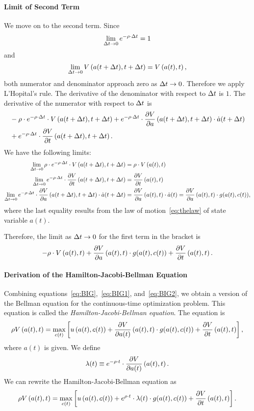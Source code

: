 \documentclass[letterpaper,12pt,leqno]{article}
\begin{document}
\paragraph{Limit of Second Term}  We move on to the second term. Since 
\[\lim_{\Delta t\to 0} e^{-\rho \cdot \Delta t}=1\]
and 
\[\lim_{\Delta t\to 0} V\left(  a(t+\Delta t),t+\Delta t \right) =V\left( a(t),t \right), \]
both numerator and denominator approach zero as $\Delta t\to 0$. Therefore we apply L'Hopital's rule. The derivative of the denominator with respect to $\Delta t$ is $1$. The derivative of the numerator with respect to $\Delta t$ is
\begin{align*}
&-\rho \cdot e^{-\rho\cdot \Delta t}\cdot V\left(  a(t+\Delta t),t+\Delta t \right)+e^{-\rho\cdot \Delta t}\cdot \frac{\partial V}{\partial a}\left(  a(t+\Delta t),t+\Delta t \right) \cdot \dot{a}(t+\Delta t)\\
&+e^{-\rho\cdot \Delta t}\cdot  \frac{\partial V}{\partial t}\left( a(t+\Delta t),t+\Delta t \right). 
\end{align*}
We have the following limits:
\begin{align*}
\lim_{\Delta t\to 0} \rho \cdot e^{-\rho\cdot \Delta t}\cdot V\left(  a(t+\Delta t),t+\Delta t \right)&=\rho \cdot V\left(  a(t),t \right)\\
\lim_{\Delta t\to 0} e^{-\rho\cdot \Delta t}\cdot  \frac{\partial V}{\partial t}\left( a(t+\Delta t),t+\Delta t \right) &= \frac{\partial V}{\partial t}\left( a(t),t \right)\\
\lim_{\Delta t\to 0} e^{-\rho\cdot \Delta t}\cdot \frac{\partial V}{\partial a}\left(  a(t+\Delta t),t+\Delta t \right)\cdot\dot{a}(t+\Delta t)&=\frac{\partial V}{\partial a}\left(  a(t),t \right) \cdot \dot{a}(t)=\frac{\partial V}{\partial a}\left(  a(t),t \right) \cdot g(a(t),c(t)),
\end{align*}
where the last equality results from the law of motion~\eqref{eq:thelaw} of state variable $a(t)$.

Therefore, the limit as $\Delta t\to 0$ for the first term in the bracket is 
\begin{equation}
-\rho \cdot V\left(  a(t),t \right)+\frac{\partial  V}{\partial a}\left(  a(t),t \right) \cdot g(a(t),c(t))+\frac{\partial V}{\partial t}\left( a(t),t \right).\label{eq:BIG2}
\end{equation}

\paragraph{Derivation of the Hamilton-Jacobi-Bellman Equation} Combining equations~\eqref{eq:BIG},~\eqref{eq:BIG1}, and~\eqref{eq:BIG2}, we obtain a version of the Bellman equation for the continuous-time optimization problem. This equation is called the \textit{Hamilton-Jacobi-Bellman equation}. The equation is
\begin{equation}
\r V\bp{ a(t),t} =\max_{c(t)}\bs{ u\bp{a(t),c(t)} +\pd{V}{a(t)}\bp{a(t),t}\cdot
g(a(t),c(t)) +\pd{V}{t}\bp{a(t),t}}, \label{eq:HJB}
\end{equation}
where $a(t)$ is given. We define \[\lambda (t)\equiv e^{-\rho \cdot t}\cdot \frac{\partial V}{\partial a(t)}\left( a(t),t \right).\]
We can rewrite the Hamilton-Jacobi-Bellman equation as
\begin{equation}
\r V\bp{ a(t),t} =\max_{c(t)}\bs{ u\bp{a(t),c(t)} +e^{\r \cdot t}\cdot\l (t)  \cdot
g(a(t),c(t)) +\pd{V}{t}\bp{a(t),t}}. \label{eq:HJB2}
\end{equation}
\end{document}
